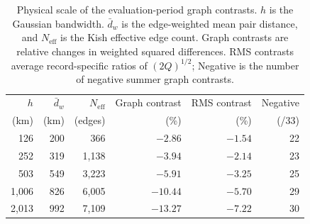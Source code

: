 \begin{table}[H]
\centering
\caption{Physical scale of the evaluation-period graph contrasts. $h$ is the
Gaussian bandwidth. $\bar d_w$ is the
edge-weighted mean pair distance, and $N_{\mathrm{eff}}$ is the Kish effective
edge count. Graph contrasts are relative changes in weighted squared
differences. RMS contrasts average record-specific ratios of
$(2Q)^{1/2}$; Negative is the number of negative summer graph contrasts.}
\label{tab:confirm-scales}
\normalsize
\renewcommand{\arraystretch}{1.5}
\setlength{\tabcolsep}{4.5pt}
\begin{tabular*}{\textwidth}{@{\extracolsep{\fill}}rrrrrr}
\toprule
$h$ & $\bar d_w$ & $N_{\mathrm{eff}}$ & Graph contrast & RMS contrast & Negative \\
(km) & (km) & (edges) & (\%) & (\%) & (/33) \\
\midrule
126   & 200 & 366   & $-2.86$  & $-1.54$ & 22 \\
252   & 319 & 1,138 & $-3.94$  & $-2.14$ & 23 \\
503   & 549 & 3,223 & $-5.91$  & $-3.25$ & 25 \\
1,006 & 826 & 6,005 & $-10.44$ & $-5.70$ & 29 \\
2,013 & 992 & 7,109 & $-13.27$ & $-7.22$ & 30 \\
\bottomrule
\end{tabular*}
\end{table}
